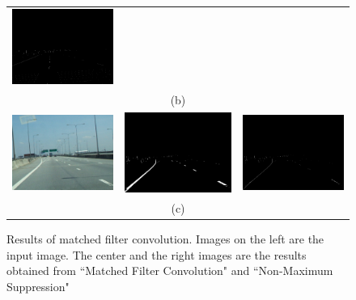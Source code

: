 \begin{figure}
\begin{tabular}{c c c}
    \includegraphics[width=55mm]{figures/localmaxima3.png} \\
    &(b)&\\
    \includegraphics[width=55mm]{figures/original4.jpg} &
    \includegraphics[width=55mm]{figures/convolution4.png} &
    \includegraphics[width=55mm]{figures/localmaxima4.png} \\
    &(c)&\\
  \end{tabular}
  \caption{Results of matched filter convolution. Images on the left are the input image. The center and the right images are the results obtained from ``Matched Filter Convolution" and ``Non-Maximum Suppression"}
  \label{fig:matched_filter_convolution}
\end{figure}


